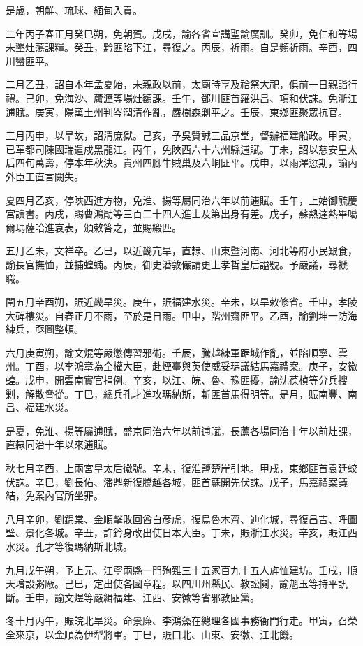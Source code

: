 \begin{pinyinscope}
是歲，朝鮮、琉球、緬甸入貢。

二年丙子春正月癸巳朔，免朝賀。戊戌，諭各省宣講聖諭廣訓。癸卯，免仁和等場未墾灶蕩課糧。癸丑，黔匪陷下江，尋復之。丙辰，祈雨。自是頻祈雨。辛酉，四川蠻匪平。

二月乙丑，詔自本年孟夏始，未親政以前，太廟時享及祫祭大祀，俱前一日親詣行禮。己卯，免海沙、蘆瀝等場灶額課。壬午，鄧川匪首羅洪昌、項和伏誅。免浙江逋賦。庚寅，陽萬土州判岑潤清作亂，嚴樹森剿平之。壬辰，東鄉匪聚眾抗官。

三月丙申，以旱故，詔清庶獄。己亥，予吳贊誠三品京堂，督辦福建船政。甲寅，已革都司陳國瑞遣戍黑龍江。丙午，免陜西六十六州縣逋賦。丁未，詔以慈安皇太后四旬萬壽，停本年秋決。貴州四腳牛賊巢及六峒匪平。戊申，以雨澤愆期，諭內外臣工直言闕失。

夏四月乙亥，停陜西進方物，免淮、揚等屬同治六年以前逋賦。壬午，上始御毓慶宮讀書。丙戌，賜曹鴻勛等三百二十四人進士及第出身有差。戊子，蘇熱達熱畢噶爾瑪薩哈進哀表，頒敕答之，並賜緞匹。

五月乙未，文祥卒。乙巳，以近畿亢旱，直隸、山東暨河南、河北等府小民艱食，諭長官撫恤，並捕蝗蝻。丙辰，御史潘敦儼請更上孝哲皇后謚號。予嚴議，尋褫職。

閏五月辛酉朔，賑近畿旱災。庚午，賑福建水災。辛未，以旱敕修省。壬申，孝陵大碑樓災。自春正月不雨，至於是日雨。甲申，階州齋匪平。乙酉，諭劉坤一防海練兵，亟圖整頓。

六月庚寅朔，諭文焜等嚴懲傳習邪術。壬辰，騰越練軍踞城作亂，並陷順寧、雲州。丁酉，以李鴻章為全權大臣，赴煙臺與英使威妥瑪議結馬嘉禮案。庚子，安徽蝗。戊申，開雲南實官捐例。辛亥，以江、皖、魯、豫匪擾，諭沈葆楨等分兵搜剿，解散脅從。丁巳，總兵孔才進攻瑪納斯，斬匪首馬得明等。是月，賑南豐、南昌、福建水災。

是夏，免淮、揚等屬逋賦，盛京同治六年以前逋賦，長蘆各場同治十年以前灶課，直隸同治十年以來逋賦。

秋七月辛酉，上兩宮皇太后徽號。辛未，復淮鹽楚岸引地。甲戌，東鄉匪首袁廷蛟伏誅。辛巳，劉長佑、潘鼎新復騰越各城，匪首蘇開先伏誅。戊子，馬嘉禮案議結，免案內官所坐罪。

八月辛卯，劉錦棠、金順擊敗回酋白彥虎，復烏魯木齊、迪化城，尋復昌吉、呼圖壁、景化各城。辛丑，許鈐身改出使日本大臣。丁未，賑浙江水災。辛亥，賑江西水災。孔才等復瑪納斯北城。

九月戊午朔，予上元、江寧兩縣一門殉難三十五家百九十五人旌恤建坊。壬戌，順天增設粥廠。己巳，定出使各國章程。以四川州縣民、教訟鬩，諭魁玉等持平訊斷。壬申，諭文煜等嚴緝福建、江西、安徽等省邪教匪黨。

冬十月丙午，賑皖北旱災。命景廉、李鴻藻在總理各國事務衙門行走。甲寅，召榮全來京，以金順為伊犁將軍。丁巳，賑口北、山東、安徽、江北饑。


\end{pinyinscope}
